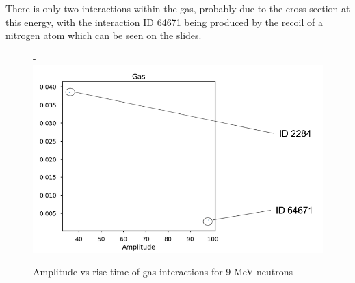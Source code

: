 \documentclass[a4paper]{article}
\begin{document}
\noindent There is only two interactions within the gas, probably due to the cross section at this energy, with the interaction ID 64671 being produced by the recoil of a nitrogen atom which can be seen on the slides.
\begin{figure}[H]-
        \centering
        \includegraphics[width=1\linewidth]{Fast/gas-id-5.PNG}
        \caption{Amplitude vs rise time of gas interactions for 9 MeV neutrons}
        \label{fig:south2d}
        \end{figure}
\end{document}
